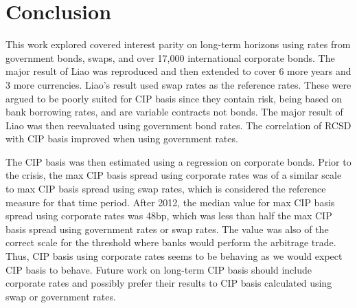 


\chapter{Conclusion} \label{conclusion_chapter}

This work explored covered interest parity on long-term horizons using rates from government bonds, swaps, and over 17,000 international corporate bonds.  The major result of Liao\cite{Liao2016} was reproduced and then extended to cover 6 more years and 3 more currencies.  Liao's result used swap rates as the reference rates.  These were argued to be poorly suited for CIP basis since they contain risk, being based on bank borrowing rates, and are variable contracts not bonds.  The major result of Liao was then reevaluated using government bond rates.  The correlation of RCSD with CIP basis improved when using government rates.

The CIP basis was then estimated using a regression on corporate bonds.  Prior to the crisis, the max CIP basis spread using corporate rates was of a similar scale to max CIP basis spread using swap rates, which is considered the reference measure for that time period.   After 2012, the median value for max CIP basis spread using corporate rates was 48bp, which was less than half the max CIP basis spread using government rates or swap rates.  The value was also of the correct scale for the threshold where banks would perform the arbitrage trade.  Thus, CIP basis using corporate rates seems to be behaving as we would expect CIP basis to behave.  Future work on long-term CIP basis should include corporate rates and possibly prefer their results to CIP basis calculated using swap or government rates. 

